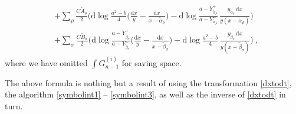 \documentclass[a4paper,12pt]{article}
\newcommand{\dif}{\mathrm{d}} %
\begin{document}
\begin{enumerate}[label=(\roman*)]
\begin{align}
         &+\sum_{\rho}\frac{C\tilde{A}_{\rho}}{2} \Biggl( \dif \log\frac{a^{2}-b}{4}\biggl(\frac{\dif x}{y}-\frac{\dif x}{x-\tilde{\alpha}_{\rho}}\biggr) 
          - \dif \log\frac{a-Y_{\tilde{\alpha}_{\rho}}^{+}}{a-Y_{\tilde{\alpha}_{\rho}}^{-}}  \,\frac{y_{\tilde{\alpha}_{\rho}}\,\dif x}{y(x-\tilde{\alpha}_{\rho})} \Biggr) \nonumber     \\
          &+\sum_{\sigma}\frac{C\tilde{B}_{\sigma}}{2} \Biggl( \dif \log\frac{a-Y_{\tilde{\beta}_{\sigma}}^{+}}{a-Y_{\tilde{\beta}_{\sigma}}^{-}}\biggl(\frac{\dif x}{y}-\frac{\dif x}{x-\tilde{\beta}_{\sigma}}\biggr) 
          - \dif \log\frac{a^{2}-b}{4}  \,\frac{y_{\tilde{\beta}_{\sigma}}\,\dif x}{y(x-\tilde{\beta}_{\sigma})} \Biggr) \:,
     \end{align}
     \endgroup
        where we have omitted $\int G^{(i)}_{n-1}$ for saving space.
    \end{enumerate}
   The above formula is nothing but a result of using the transformation \eqref{dxtodt}, the algorithm \eqref{symbolint1} -- \eqref{symbolint3}, as well as the inverse of \eqref{dxtodt} in turn.  



 

\end{document}
